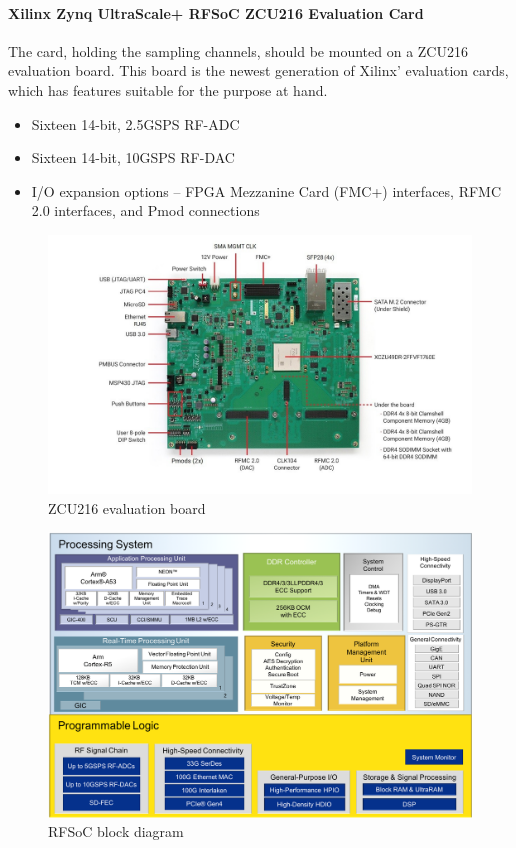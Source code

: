 \paragraph{Xilinx Zynq UltraScale+ RFSoC ZCU216 Evaluation Card}
The card, holding the sampling channels, should be mounted on a ZCU216 evaluation board. This board is the newest generation of Xilinx' evaluation cards, which has features suitable for the purpose at hand.
\begin{itemize}[noitemsep]
\item Sixteen 14-bit, 2.5GSPS RF-ADC
\item Sixteen 14-bit, 10GSPS RF-DAC
\item I/O expansion options – FPGA Mezzanine Card (FMC+) interfaces, RFMC 2.0 interfaces, and Pmod connections
\end{itemize}
\begin{figure}[H]
	\centering
	\includegraphics[width = \textwidth]{chap/03-work/img/zcu216}
	\caption{ZCU216 evaluation board}
	\label{fig:zcu216}
\end{figure}
 
\begin{figure}[H]
	\centering
	\includegraphics[width = \textwidth]{chap/03-work/img/rfsoc_blockdiagram}
	\caption{RFSoC block diagram}
	\label{fig:rfsoc}
\end{figure}

